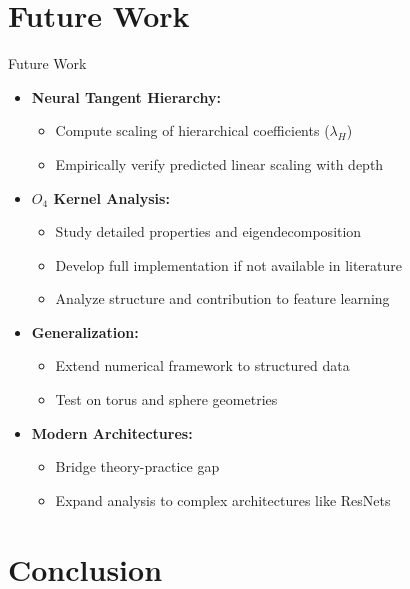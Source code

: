 \documentclass{beamer}
\begin{document}
\section{Future Work}
\begin{frame}{Future Work}
\begin{itemize}
    \item \textbf{Neural Tangent Hierarchy:}
    \begin{itemize}
        \item Compute scaling of hierarchical coefficients ($\lambda_H$)
        \item Empirically verify predicted linear scaling with depth
    \end{itemize}
    
    \item \textbf{$O_4$ Kernel Analysis:}
    \begin{itemize}
        \item Study detailed properties and eigendecomposition
        \item Develop full implementation if not available in literature
        \item Analyze structure and contribution to feature learning
    \end{itemize}
    
    \item \textbf{Generalization:}
    \begin{itemize}
        \item Extend numerical framework to structured data
        \item Test on torus and sphere geometries
    \end{itemize}
    
    \item \textbf{Modern Architectures:}
    \begin{itemize}
        \item Bridge theory-practice gap
        \item Expand analysis to complex architectures like ResNets
    \end{itemize}
\end{itemize}
\end{frame}

\section{Conclusion}
\end{document}
